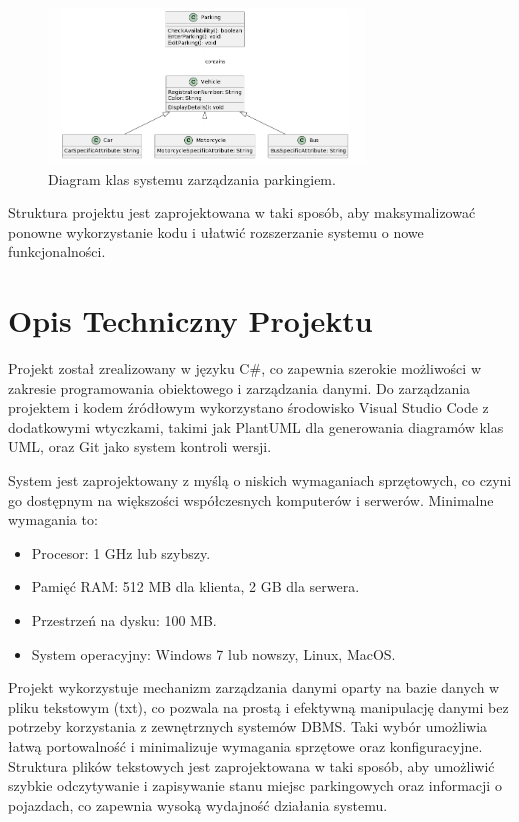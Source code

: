 \documentclass{article}
\begin{document}
\begin{figure}[H]
\centering
\includegraphics[width=0.75\textwidth]{photos/diagram.png}
\caption{Diagram klas systemu zarządzania parkingiem.}
\end{figure}

Struktura projektu jest zaprojektowana w taki sposób, aby maksymalizować ponowne wykorzystanie kodu i ułatwić rozszerzanie systemu o nowe funkcjonalności.

\section{Opis Techniczny Projektu}

Projekt został zrealizowany w języku C\#, co zapewnia szerokie możliwości w zakresie programowania obiektowego i zarządzania danymi. Do zarządzania projektem i kodem źródłowym wykorzystano środowisko Visual Studio Code z dodatkowymi wtyczkami, takimi jak PlantUML dla generowania diagramów klas UML, oraz Git jako system kontroli wersji.

System jest zaprojektowany z myślą o niskich wymaganiach sprzętowych, co czyni go dostępnym na większości współczesnych komputerów i serwerów. Minimalne wymagania to:
\begin{itemize}
    \item Procesor: 1 GHz lub szybszy.
    \item Pamięć RAM: 512 MB dla klienta, 2 GB dla serwera.
    \item Przestrzeń na dysku: 100 MB.
    \item System operacyjny: Windows 7 lub nowszy, Linux, MacOS.
\end{itemize}

Projekt wykorzystuje mechanizm zarządzania danymi oparty na bazie danych w pliku tekstowym (txt), co pozwala na prostą i efektywną manipulację danymi bez potrzeby korzystania z zewnętrznych systemów DBMS. Taki wybór umożliwia łatwą portowalność i minimalizuje wymagania sprzętowe oraz konfiguracyjne. Struktura plików tekstowych jest zaprojektowana w taki sposób, aby umożliwić szybkie odczytywanie i zapisywanie stanu miejsc parkingowych oraz informacji o pojazdach, co zapewnia wysoką wydajność działania systemu.
\clearpage
\end{document}
